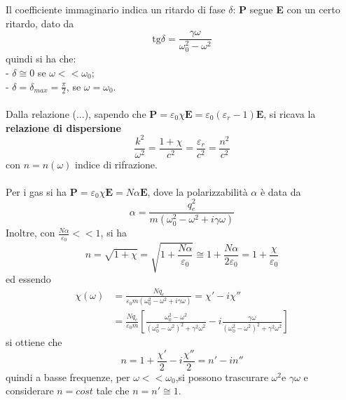 \documentclass{article}
\begin{document}
Il coefficiente immaginario indica un ritardo di fase $\delta$: \textbf{P} segue \textbf{E} con un certo ritardo, dato da
\begin{equation}
    \text{tg}\delta=\frac{\gamma\omega}{\omega_0^2-\omega^2}
\nonumber
\end{equation}
quindi si ha che:\\
- $\delta\cong 0$ se $\omega<<\omega_0$;\\
- $\delta=\delta_{max}=\frac{\pi}{2}$, se $\omega=\omega_0$.\\
\\
Dalla relazione (...), sapendo che $\textbf{P}=\varepsilon_0\chi\textbf{E}=\varepsilon_0(\varepsilon_r-1)\textbf{E}$, si ricava la \textbf{relazione di dispersione}
\begin{equation}
    \frac{k^2}{\omega^2}=\frac{1+\chi}{c^2}=\frac{\varepsilon_r}{c^2}=\frac{n^2}{c^2}
    \nonumber 
\end{equation}
con $n=n(\omega)$ indice di rifrazione.\\
\\
Per i gas si ha $\textbf{P}=\varepsilon_0\chi\textbf{E} =N\alpha\textbf{E}$, dove la polarizzabilità $\alpha$ è data da
\begin{equation}
    \alpha=\frac{q_e^2}{m(\omega_0^2-\omega^2+i\gamma\omega)}
    \nonumber
\end{equation}
Inoltre, con $\frac{N\alpha}{\varepsilon_0}<<1$, si ha
\begin{equation}
    n=\sqrt{1+\chi}=\sqrt{1+\frac{N\alpha}{\varepsilon_0}}\cong 1+\frac{N\alpha}{2\varepsilon_0}=1+\frac{\chi}{\varepsilon_0}
    \nonumber    
\end{equation}
ed essendo
\begin{equation}
\begin{split}
    \chi(\omega)&=\frac{Nq_e}{\varepsilon_0m(\omega_0^2-\omega^2+i\gamma\omega)}=\chi'-i\chi''\\
    &=\frac{Nq_e}{\varepsilon_0m}\left[\frac{\omega_0^2-\omega^2}{(\omega_0^2-\omega^2)^2+\gamma^2\omega^2}-i\frac{\gamma\omega}{(\omega_0^2-\omega^2)^2+\gamma^2\omega^2}\right]
    \nonumber
\end{split}
\end{equation}
si ottiene che
\begin{equation}
    n=1+\frac{\chi'}{2}-i\frac{\chi''}{2}=n'-in''
    \nonumber
\end{equation}
quindi a basse frequenze, per $\omega<<\omega_0$,si possono trascurare $\omega^2$e $\gamma\omega$ e considerare $n=cost$ tale che $n=n'\cong1$.\\
\end{document}
